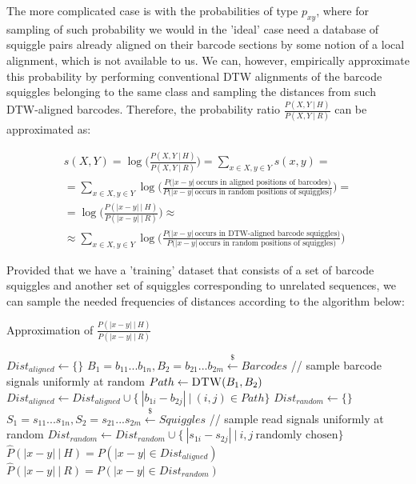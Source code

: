 The more complicated case is with the probabilities of type $p_{xy}$, where for sampling of such probability we would in the 'ideal' case need a database of squiggle pairs already aligned on their barcode sections by some notion of a local alignment, which is not available to us. We can, however, empirically approximate this probability by performing conventional DTW alignments of the barcode squiggles belonging to the same class and sampling the distances from such DTW-aligned barcodes. Therefore, the probability ratio $\frac{P(X, Y ~|~ H)}{P(X, Y ~|~ R)}$ can be approximated as:

\begin{multline}
s(X, Y) =   \log \Bigg( \frac{P(X, Y ~|~ H)}{P(X, Y ~|~ R)} \Bigg) =
\sum_{x \in X, y \in Y} s(x, y) =\\=
\sum_{x \in X, y \in Y} \log \Bigg( \frac{P \big(|x - y|~ \text{occurs in aligned positions of barcodes}  \big)}{P \big(|x - y|~ \text{occurs in random positions of squiggles} \big)} \Bigg) =\\= \log \Bigg( \frac{P(|x-y| ~|~ H)}{P(|x-y| ~|~ R)} \Bigg) \approx \\ \approx
\sum_{x \in X, y \in Y} \log \Bigg(
\frac{P \big(|x - y|~ \text{occurs in DTW-aligned barcode squiggles} \big)}{P \big(|x - y|~ \text{occurs in random positions of squiggles} \big)} \Bigg)
\end{multline}

Provided that we have a 'training' dataset that consists of a set of barcode squiggles and another set of squiggles corresponding to unrelated sequences, we can sample the needed frequencies of distances according to the algorithm below:

\begin{algorithm}[H]
\renewcommand{\thealgorithm}{}
\caption{Approximation of $\frac{P(|x-y| ~|~ H)}{P(|x-y| ~|~ R)}$ }
\begin{algorithmic}[1]
\STATE $Dist_{aligned} \gets \{\}$
\STATE $B_1 = b_{11}...b_{1n}, B_2 = b_{21}...b_{2m} \xleftarrow{\$} Barcodes$ // sample barcode signals uniformly at random
\STATE $Path \gets \textsc{DTW}(B_1, B_2)$
\STATE $Dist_{aligned} \gets Dist_{aligned} \cup \{~ |b_{1i} - b_{2j}| ~|~ (i,j) \in Path \}$
\ENDFOR
\STATE $Dist_{random} \gets \{\}$
\STATE $S_1 = s_{11}...s_{1n}, S_2 = s_{21}...s_{2m} \xleftarrow{\$} Squiggles$ // sample read signals uniformly at random
\STATE $Dist_{random} \gets Dist_{random} \cup \{~ |s_{1i} - s_{2j}| ~|~ i,j~ \text{randomly chosen} \}$
\ENDWHILE
\STATE $\hat{P}(|x-y| ~|~ H) = P(|x-y| \in Dist_{aligned})$
\STATE $\hat{P}(|x-y| ~|~ R)= P(|x-y| \in Dist_{random})$
\end{algorithmic}
\end{algorithm} 
\bigskip

